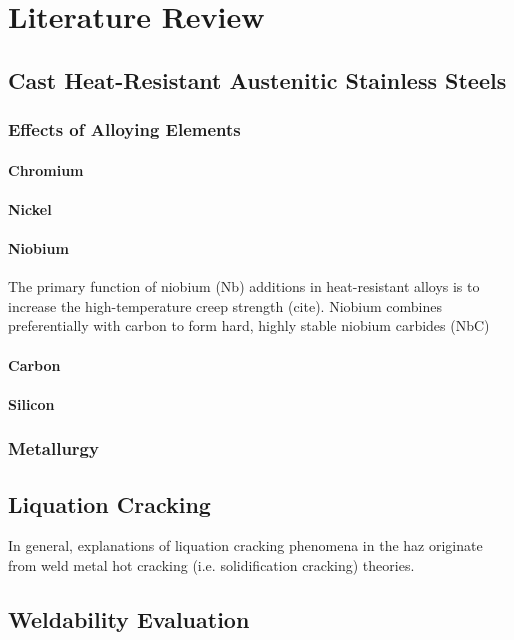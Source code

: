 \chapter{Literature Review} \label{ch:literature-review}

\section{Cast Heat-Resistant Austenitic Stainless Steels}


\subsection{Effects of Alloying Elements}
\subsubsection{Chromium}
\subsubsection{Nickel}
\subsubsection{Niobium}
The primary function of niobium (Nb) additions in heat-resistant alloys is to increase the high-temperature creep strength (cite). Niobium combines preferentially with carbon to form hard, highly stable niobium carbides (NbC)
\subsubsection{Carbon}
\subsubsection{Silicon}



\subsection{Metallurgy}

\section{Liquation Cracking}
In general, explanations of liquation cracking phenomena in the \gls{haz} originate from weld metal hot cracking (i.e. solidification cracking) theories. 


\section{Weldability Evaluation} \label{sec:weldability-evaluation}

